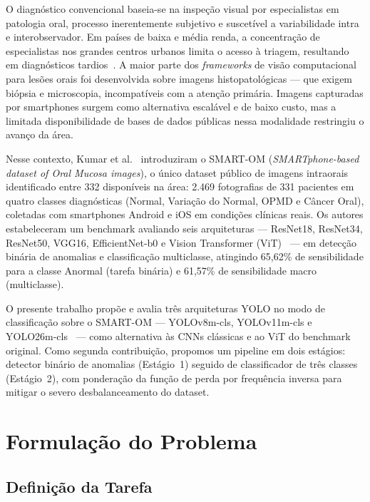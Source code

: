 \documentclass[12pt]{article}
\begin{document}
O diagnóstico convencional baseia-se na inspeção visual por especialistas
em patologia oral, processo inerentemente subjetivo e suscetível a
variabilidade intra e interobservador.
Em países de baixa e média renda, a concentração de especialistas nos
grandes centros urbanos limita o acesso à triagem, resultando em
diagnósticos tardios~\cite{globocan2020}.
A maior parte dos \textit{frameworks} de visão computacional para lesões
orais foi desenvolvida sobre imagens histopatológicas — que exigem biópsia
e microscopia, incompatíveis com a atenção primária.
Imagens capturadas por smartphones surgem como alternativa escalável e de
baixo custo, mas a limitada disponibilidade de bases de dados públicas
nessa modalidade restringiu o avanço da área.

Nesse contexto, Kumar et al.~\cite{smartom} introduziram o SMART-OM
(\textit{SMARTphone-based dataset of Oral Mucosa images}), o único dataset
público de imagens intraorais identificado entre 332 disponíveis na área:
2.469 fotografias de 331 pacientes em quatro classes diagnósticas (Normal,
Variação do Normal, OPMD e Câncer Oral), coletadas com smartphones Android
e iOS em condições clínicas reais.
Os autores estabeleceram um benchmark avaliando seis arquiteturas —
ResNet18, ResNet34, ResNet50, VGG16, EfficientNet-b0 e Vision Transformer
(ViT)~\cite{resnet,efficientnet,vit} — em detecção binária de anomalias e
classificação multiclasse, atingindo 65,62\% de sensibilidade para a classe
Anormal (tarefa binária) e 61,57\% de sensibilidade macro (multiclasse).

O presente trabalho propõe e avalia três arquiteturas YOLO no modo de
classificação sobre o SMART-OM — YOLOv8m-cls, YOLOv11m-cls e
YOLO26m-cls~\cite{yolov8,yolo11,yolo26} — como alternativa às CNNs
clássicas e ao ViT do benchmark original.
Como segunda contribuição, propomos um pipeline em dois estágios:
detector binário de anomalias (Estágio~1) seguido de classificador de
três classes (Estágio~2), com ponderação da função de perda por frequência
inversa para mitigar o severo desbalanceamento do dataset.

\section{Formulação do Problema}
\label{sec:formulacao}

\subsection{Definição da Tarefa}
\end{document}
